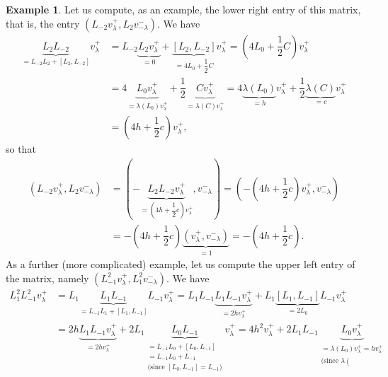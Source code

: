 \documentclass
[numbers=enddot,12pt,final,onecolumn,german,notitlepage]{scrartcl}%
\theoremstyle{definition}
\newtheorem{example}[theo]{Example}
\begin{document}
\begin{example}
Let us compute, as an example, the lower right entry of this matrix, that is,
the entry $\left(  L_{-2}v_{\lambda}^{+},L_{2}v_{-\lambda}^{-}\right)  $. We
have%
\begin{align*}
\underbrace{L_{2}L_{-2}}_{=L_{-2}L_{2}+\left[  L_{2},L_{-2}\right]
}v_{\lambda}^{+}  &  =L_{-2}\underbrace{L_{2}v_{\lambda}^{+}}_{=0}%
+\underbrace{\left[  L_{2},L_{-2}\right]  }_{=4L_{0}+\dfrac{1}{2}C}v_{\lambda
}^{+}=\left(  4L_{0}+\dfrac{1}{2}C\right)  v_{\lambda}^{+}\\
&  =4\underbrace{L_{0}v_{\lambda}^{+}}_{=\lambda\left(  L_{0}\right)
v_{\lambda}^{+}}+\dfrac{1}{2}\underbrace{Cv_{\lambda}^{+}}_{=\lambda\left(
C\right)  v_{\lambda}^{+}}=4\underbrace{\lambda\left(  L_{0}\right)  }%
_{=h}v_{\lambda}^{+}+\dfrac{1}{2}\underbrace{\lambda\left(  C\right)  }%
_{=c}v_{\lambda}^{+}\\
&  =\left(  4h+\dfrac{1}{2}c\right)  v_{\lambda}^{+},
\end{align*}
so that%
\begin{align*}
\left(  L_{-2}v_{\lambda}^{+},L_{2}v_{-\lambda}^{-}\right)   &  =\left(
-\underbrace{L_{2}L_{-2}v_{\lambda}^{+}}_{=\left(  4h+\dfrac{1}{2}c\right)
v_{\lambda}^{+}},v_{-\lambda}^{-}\right)  =\left(  -\left(  4h+\dfrac{1}%
{2}c\right)  v_{\lambda}^{+},v_{-\lambda}^{-}\right) \\
&  =-\left(  4h+\dfrac{1}{2}c\right)  \underbrace{\left(  v_{\lambda}%
^{+},v_{-\lambda}^{-}\right)  }_{=1}=-\left(  4h+\dfrac{1}{2}c\right)  .
\end{align*}
As a further (more complicated) example, let us compute the upper left entry
of the matrix, namely $\left(  L_{-1}^{2}v_{\lambda}^{+},L_{1}^{2}v_{-\lambda
}^{-}\right)  $. We have%
\begin{align*}
L_{1}^{2}L_{-1}^{2}v_{\lambda}^{+}  &  =L_{1}\underbrace{L_{1}L_{-1}}%
_{=L_{-1}L_{1}+\left[  L_{1},L_{-1}\right]  }L_{-1}v_{\lambda}^{+}=L_{1}%
L_{-1}\underbrace{L_{1}L_{-1}v_{\lambda}^{+}}_{=2hv_{\lambda}^{+}}%
+L_{1}\underbrace{\left[  L_{1},L_{-1}\right]  }_{=2L_{0}}L_{-1}v_{\lambda
}^{+}\\
&  =2h\underbrace{L_{1}L_{-1}v_{\lambda}^{+}}_{=2hv_{\lambda}^{+}}%
+2L_{1}\underbrace{L_{0}L_{-1}}_{\substack{=L_{-1}L_{0}+\left[  L_{0}%
,L_{-1}\right]  \\=L_{-1}L_{0}+L_{-1}\\\text{(since }\left[  L_{0}%
,L_{-1}\right]  =L_{-1}\text{)}}}v_{\lambda}^{+}=4h^{2}v_{\lambda}^{+}%
+2L_{1}L_{-1}\underbrace{L_{0}v_{\lambda}^{+}}_{\substack{=\lambda\left(
L_{0}\right)  v_{\lambda}^{+}=hv_{\lambda}^{+}\\\text{(since }\lambda\left(
}}
\end{align*}
\end{example}
\end{document}
